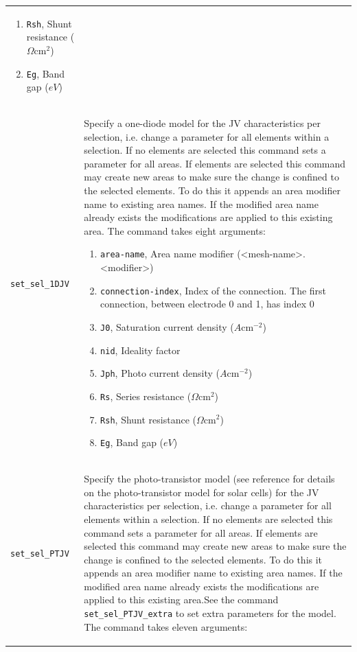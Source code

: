 \documentclass[noshowpacs,preprintnumbers,amsmath,amssymb, letter]{revtex4}
\begin{document}
\begin{longtable}{p{}p{}}
\begin{enumerate}
\item \texttt{Rsh}, Shunt resistance ($\Omega \text{cm}^2$)
\item \texttt{Eg}, Band gap ($eV$)
\end{enumerate}\\
\texttt{set\_sel\_1DJV}	&  Specify a one-diode model for the JV characteristics per selection, i.e. change a parameter for all elements within a selection. If no elements are selected this command sets a parameter for all areas. If elements are selected this command may create new areas to make sure the change is confined to the selected elements. To do this it appends an area modifier name to existing area names. If the modified area name already exists the modifications are applied to this existing area. The command takes eight arguments:
\begin{enumerate}
\item \texttt{area-name}, Area name modifier (\textless mesh-name\textgreater .\textless modifier\textgreater )
\item \texttt{connection-index}, Index of the connection. The first connection, between electrode 0 and 1,  has index 0
\item \texttt{J0}, Saturation current density ($A \text{cm}^{-2}$)
\item \texttt{nid}, Ideality factor
\item \texttt{Jph}, Photo current density ($A \text{cm}^{-2}$)
\item \texttt{Rs}, Series resistance ($\Omega \text{cm}^2$)
\item \texttt{Rsh}, Shunt resistance ($\Omega \text{cm}^2$)
\item \texttt{Eg}, Band gap ($eV$)
\end{enumerate}\\
\texttt{set\_sel\_PTJV}	&  Specify the photo-transistor model (see reference \cite{Walter:photo-T} for details on the photo-transistor model for solar cells) for the JV characteristics per selection, i.e. change a parameter for all elements within a selection. If no elements are selected this command sets a parameter for all areas. If elements are selected this command may create new areas to make sure the change is confined to the selected elements. To do this it appends an area modifier name to existing area names. If the modified area name already exists the modifications are applied to this existing area.See the command \texttt{set\_sel\_PTJV\_extra} to set extra parameters for the model. The command takes eleven arguments:
\begin{enumerate}

\end{enumerate}
\end{longtable}
\end{document}
